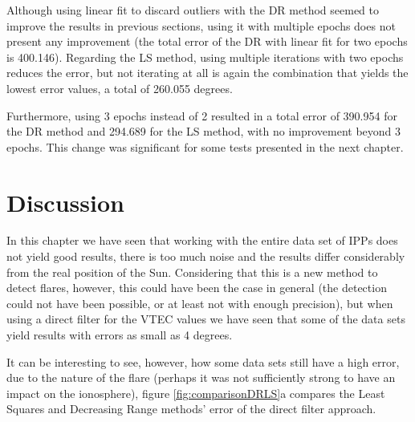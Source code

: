 Although using linear fit to discard outliers with the DR method seemed to improve the results in previous sections, using it with multiple epochs does not present any improvement (the total error of the DR with linear fit for two epochs is 400.146). Regarding the LS method, using multiple iterations with two epochs reduces the error, but not iterating at all is again the combination that yields the lowest error values, a total of 260.055 degrees.

Furthermore, using 3 epochs instead of 2 resulted in a total error of 390.954 for the DR method and 294.689 for the LS method, with no improvement beyond 3 epochs. This change was significant for some tests presented in the next chapter.

\clearpage

\section{Discussion}

In this chapter we have seen that working with the entire data set of IPPs does not yield good results, there is too much noise and the results differ considerably from the real position of the Sun. Considering that this is a new method to detect flares, however, this could have been the case in general (the detection could not have been possible, or at least not with enough precision), but when using a direct filter for the VTEC values we have seen that some of the data sets yield results with errors as small as 4 degrees.

It can be interesting to see, however, how some data sets still have a high error, due to the nature of the flare (perhaps it was not sufficiently strong to have an impact on the ionosphere), figure \ref{fig:comparisonDRLS}a compares the Least Squares and Decreasing Range methods' error of the direct filter approach.

